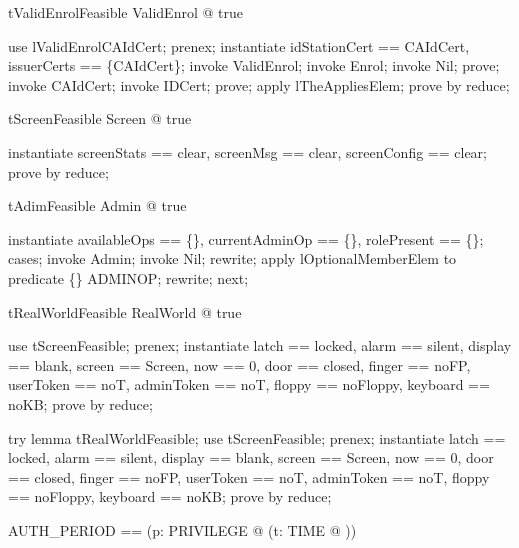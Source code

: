\begin{theorem}{tValidEnrolFeasible}
\exists  ValidEnrol @ true
\end{theorem}

\begin{zproof}[tValidEnrolFeasible]
use lValidEnrolCAIdCert;
prenex;
instantiate idStationCert == \theta  CAIdCert, issuerCerts == \{\theta  CAIdCert\};
invoke ValidEnrol;
invoke Enrol;
invoke Nil;
prove;
invoke CAIdCert;
invoke IDCert;
prove;
apply lTheAppliesElem;
prove by reduce;
\end{zproof}

\begin{theorem}{tScreenFeasible}
\exists  Screen @ true
\end{theorem}

\begin{zproof}[tScreenFeasible]
instantiate screenStats == clear, screenMsg == clear, screenConfig == clear;
prove by reduce;
\end{zproof}

\begin{theorem}{tAdimFeasible}
\exists  Admin @ true
\end{theorem}

\begin{zproof}[tAdimFeasible]
instantiate availableOps == \{\}, currentAdminOp == \{\}, rolePresent == \{\};
cases;
invoke Admin;
invoke Nil;
rewrite;
apply lOptionalMemberElem to predicate \{\} \in  \Optional ADMINOP;
rewrite;
next;
\end{zproof}

\begin{theorem}{tRealWorldFeasible}
\exists  RealWorld @ true
\end{theorem}

\begin{zproof}[tRealWorldFeasible]
use tScreenFeasible;
prenex;
instantiate latch == locked, alarm == silent, display == blank, screen == \theta  Screen, now == 0, door == closed, finger == noFP, userToken == noT, adminToken == noT, floppy == noFloppy, keyboard == noKB;
prove by reduce;
\end{zproof}

try lemma tRealWorldFeasible;
use tScreenFeasible;
prenex;
instantiate
  latch == locked, alarm == silent, display == blank, screen == \theta Screen,
  now == 0, door == closed, finger == noFP, userToken == noT,
  adminToken == noT, floppy == noFloppy, keyboard == noKB;
prove by reduce;


\begin{zed}
AUTH\_PERIOD == (\lambda  p: PRIVILEGE @ (\lambda  t: TIME @ \emptyset[\num ]))
\end{zed}

